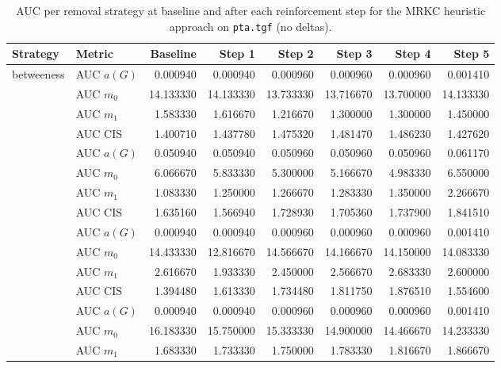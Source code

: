 \begin{table}[htbp]
  \centering
  \caption{AUC per removal strategy at baseline and after each reinforcement step for the MRKC heuristic approach on \texttt{pta.tgf} (no deltas).}
  \label{tab:pta-mrkc_heuristic-auc}
  \begin{tabular}{llrrrrrr}
    \toprule
    \textbf{Strategy} & \textbf{Metric} & \textbf{Baseline} & \textbf{Step 1} & \textbf{Step 2} & \textbf{Step 3} & \textbf{Step 4} & \textbf{Step 5} \\
    \midrule
    \multirow{4}{*}{betweeness} & AUC $a(G)$ & 0.000940 & 0.000940 & 0.000960 & 0.000960 & 0.000960 & 0.001410 \\
    & AUC $m_0$ & 14.133330 & 14.133330 & 13.733330 & 13.716670 & 13.700000 & 14.133330 \\
    & AUC $m_1$ & 1.583330 & 1.616670 & 1.216670 & 1.300000 & 1.300000 & 1.450000 \\
    & AUC CIS & 1.400710 & 1.437780 & 1.475320 & 1.481470 & 1.486230 & 1.427620 \\
    \addlinespace
    \multirow{4}{*}{closeness} & AUC $a(G)$ & 0.050940 & 0.050940 & 0.050960 & 0.050960 & 0.050960 & 0.061170 \\
    & AUC $m_0$ & 6.066670 & 5.833330 & 5.300000 & 5.166670 & 4.983330 & 6.550000 \\
    & AUC $m_1$ & 1.083330 & 1.250000 & 1.266670 & 1.283330 & 1.350000 & 2.266670 \\
    & AUC CIS & 1.635160 & 1.566940 & 1.728930 & 1.705360 & 1.737900 & 1.841510 \\
    \addlinespace
    \multirow{4}{*}{core influence} & AUC $a(G)$ & 0.000940 & 0.000940 & 0.000960 & 0.000960 & 0.000960 & 0.001410 \\
    & AUC $m_0$ & 14.433330 & 12.816670 & 14.566670 & 14.166670 & 14.150000 & 14.083330 \\
    & AUC $m_1$ & 2.616670 & 1.933330 & 2.450000 & 2.566670 & 2.683330 & 2.600000 \\
    & AUC CIS & 1.394480 & 1.613330 & 1.734480 & 1.811750 & 1.876510 & 1.554600 \\
    \addlinespace
    \multirow{4}{*}{degree} & AUC $a(G)$ & 0.000940 & 0.000940 & 0.000960 & 0.000960 & 0.000960 & 0.001410 \\
    & AUC $m_0$ & 16.183330 & 15.750000 & 15.333330 & 14.900000 & 14.466670 & 14.233330 \\
    & AUC $m_1$ & 1.683330 & 1.733330 & 1.750000 & 1.783330 & 1.816670 & 1.866670 \\

\end{tabular}
\end{table}
